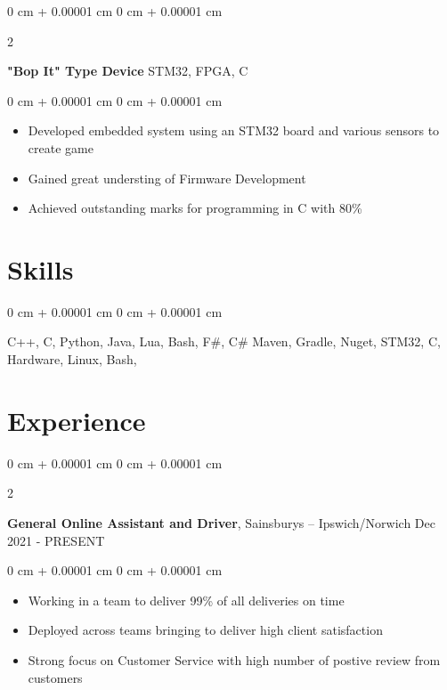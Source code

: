 \documentclass[10pt, letterpaper]{article}
\newenvironment{highlights}{
    \begin{itemize}[
        topsep=0.10 cm,
        parsep=0.10 cm,
        partopsep=0pt,
        itemsep=0pt,
        leftmargin=0 cm + 10pt
    ]
}{
    \end{itemize}
} %
\newenvironment{onecolentry}{
    \begin{adjustwidth}{
        0 cm + 0.00001 cm
    }{
        0 cm + 0.00001 cm
    }
}{
    \end{adjustwidth}
} %
\newenvironment{twocolentry}[2][]{
    \onecolentry
    \def\secondColumn{#2}
    \setcolumnwidth{\fill, 4.5 cm}
    \begin{paracol}{2}
}{
    \switchcolumn \raggedleft \secondColumn
    \end{paracol}
    \endonecolentry
} %
\begin{document}
    \vspace{0.2 cm}

    \begin{twocolentry}{
        STM32, FPGA, C
    }
        \textbf{"Bop It" Type Device}\end{twocolentry}

    \vspace{0.10 cm}
    \begin{onecolentry}
        \begin{highlights}
            \item Developed embedded system using an STM32 board and various sensors to create game 
            \item Gained great understing of Firmware Development
            \item Achieved outstanding marks for programming in C with 80\%
        \end{highlights}
    \end{onecolentry}

    \section{Skills}
    \begin{onecolentry}
        C++, C, Python, Java, Lua, Bash, F\#, C\# Maven, Gradle, Nuget, STM32, C, Hardware, Linux, Bash,
    \end{onecolentry}
    \section{Experience}

    \begin{twocolentry}{
        Dec 2021 - PRESENT
    }
        \textbf{General Online Assistant and Driver}, Sainsburys -- Ipswich/Norwich\end{twocolentry}
    \begin{onecolentry}
        \begin{highlights}
            \item Working in a team to deliver 99\% of all deliveries on time 
            \item Deployed across teams bringing to deliver high client satisfaction
            \item Strong focus on Customer Service with high number of postive review from customers
        \end{highlights}
    \end{onecolentry}
\end{document}
